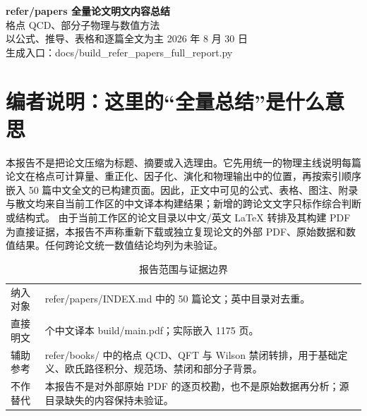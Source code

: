 \documentclass[UTF8,11pt,oneside]{ctexbook}
\begin{document}
\frontmatter
\begin{titlepage}
  \centering
  \vspace*{2.0cm}
  {\Huge\bfseries refer/papers 全量论文明文内容总结\\[0.8em]}
  {\Large 格点 QCD、部分子物理与数值方法\\[1.4em]}
  {\large 以公式、推导、表格和逐篇全文为主}
  \vfill
  {\large 2026 年 8 月 30 日\\[0.5em]}
  {\normalsize 生成入口：docs/build\_refer\_papers\_full\_report.py}
\end{titlepage}
\chapter*{编者说明：这里的“全量总结”是什么意思}
本报告不是把论文压缩为标题、摘要或入选理由。它先用统一的物理主线说明每篇论文在格点可计算量、重正化、因子化、演化和物理输出中的位置，再按索引顺序嵌入 50 篇中文全文的已构建页面。因此，正文中可见的公式、表格、图注、附录与散文均来自当前工作区的中文译本构建结果；新增的跨论文文字只标作综合判断或结构式。
由于当前工作区的论文目录以中文/英文 LaTeX 转排及其构建 PDF 为直接证据，本报告不声称重新下载或独立复现论文的外部 PDF、原始数据和数值结果。任何跨论文统一数值结论均列为未验证。
\begin{table}[htbp]
  \centering
  \caption{报告范围与证据边界}
  \small
  \begin{tabularx}{0.96\textwidth}{@{}p{3.3cm}>{\raggedright\arraybackslash}X@{}}
    \toprule
    纳入对象 & refer/papers/INDEX.md 中的 50 篇论文；英中目录对去重。 \\
    直接明文 & 50 个中文译本 build/main.pdf；实际嵌入 1175 页。 \\
    辅助参考 & refer/books/ 中的格点 QCD、QFT 与 Wilson 禁闭转排，用于基础定义、欧氏路径积分、规范场、禁闭和部分子背景。 \\
    不作替代 & 本报告不是对外部原始 PDF 的逐页校勘，也不是原始数据再分析；源目录缺失的内容保持未验证。 \\
    \bottomrule
  \end{tabularx}
\end{table}
\end{document}
